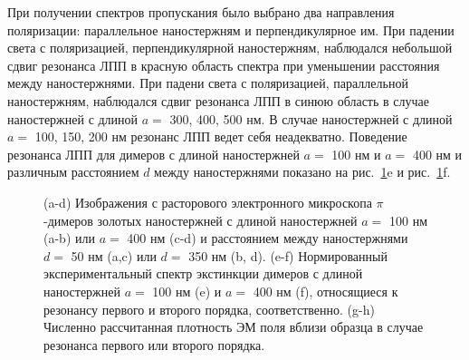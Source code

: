 При получении спектров пропускания было выбрано два направления поляризации: параллельное наностержням и перпендикулярное им. При падении света с поляризацией, перпендикулярной наностержням, наблюдался небольшой сдвиг резонанса ЛПП в красную область спектра при уменьшении расстояния между наностержнями. При падени света с поляризацией, параллельной наностержням, наблюдался сдвиг резонанса ЛПП в синюю область в случае наностержней с длиной $ a = $ 300, 400, 500 нм. В случае наностержней с длиной $ a = $ 100, 150, 200 нм резонанс ЛПП ведет себя неадекватно. Поведение резонанса ЛПП для димеров с длиной наностержней $ a = $ 100 нм и $ a = $ 400 нм и различным расстоянием $ d $ между наностержнями показано на рис.~\ref{img:general}e и рис.~\ref{img:general}f.
\begin{figure}[!h]
\caption{(a-d) Изображения с расторового электронного микроскопа $ \pi $-димеров золотых наностержней с длиной наностержней $ a = $ 100 нм (a-b) или $ a = $ 400 нм (c-d) и расстоянием между наностержнями $ d = $ 50 нм (a,c) или $ d = $ 350 нм (b, d). (e-f) Нормированный экспериментальный спектр экстинкции димеров с длиной наностержней $ a = $ 100 нм (e) и $ a = $ 400 нм (f), относящиеся к резонансу первого и второго порядка, соответственно. (g-h) Численно рассчитанная плотность ЭМ поля вблизи образца в случае резонанса первого или второго порядка.}
\label{img:general}
\end{figure}

